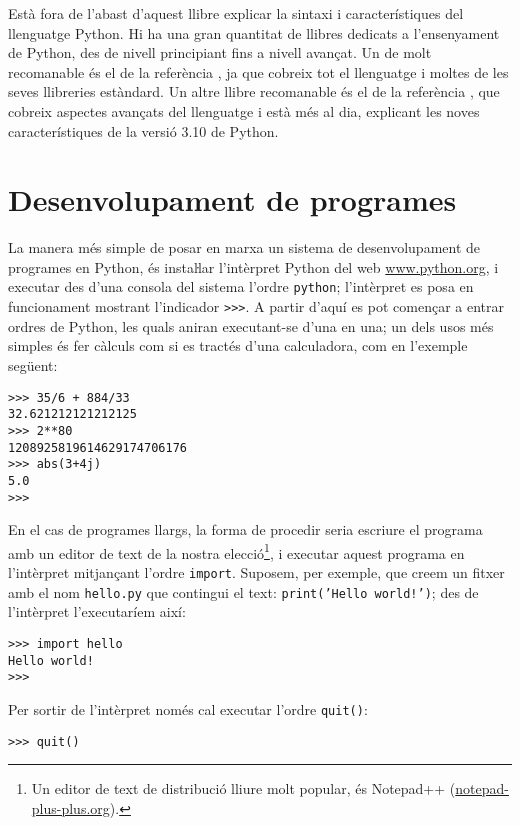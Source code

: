 Està fora de l'abast d'aquest llibre explicar la sintaxi i característiques del llenguatge Python. Hi ha una gran quantitat de llibres dedicats a l'ensenyament de Python, des de nivell principiant fins a nivell avançat. Un de molt recomanable és el de la referència \cite{SUM}, ja que cobreix tot el llenguatge i moltes de les seves llibreries estàndard. Un altre llibre recomanable és el de la referència \cite{RAM}, que cobreix aspectes avançats del llenguatge i està més al dia, explicant les noves característiques de la versió 3.10 de Python.


\section{Desenvolupament de programes}\label{sec:py-desenvel-prog}

La manera més simple de posar en marxa un sistema de desenvolupament de programes en Python, és instaŀlar l'intèrpret Python del web \href{https://www.python.org/}{www.python.org}, i executar des d'una consola del sistema l'ordre \texttt{python};
l'intèrpret es posa en funcionament mostrant l'indicador \texttt{>{}>{}>}. A partir d'aquí es pot començar a entrar ordres de Python, les quals aniran executant-se d'una en una; un dels usos més simples és  fer càlculs com si es tractés d'una calculadora, com en l'exemple següent:
\begin{lstlisting}
>>> 35/6 + 884/33
32.621212121212125
>>> 2**80
1208925819614629174706176
>>> abs(3+4j)
5.0
>>>
\end{lstlisting}

En el cas de programes llargs, la forma de procedir seria escriure el programa amb un editor de text de la nostra elecció\footnote{Un editor de text de distribució lliure molt popular, és Notepad++ (\href{https://notepad-plus-plus.org/}{notepad-plus-plus.org}).}, i executar aquest programa en l'intèrpret mitjançant l'ordre \texttt{import}. Suposem, per exemple, que creem un fitxer amb el nom \texttt{hello.py} que contingui el text: \texttt{print('Hello world!')}; des de l'intèrpret l'executaríem així:
\begin{lstlisting}
>>> import hello
Hello world!
>>>
\end{lstlisting}

Per sortir de l'intèrpret només cal executar l'ordre \texttt{quit()}:
\begin{lstlisting}
>>> quit()
\end{lstlisting}



